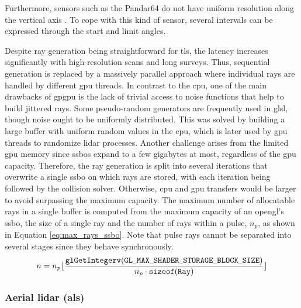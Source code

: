 Furthermore, sensors such as the Pandar64 do not have uniform resolution along the vertical axis \cite{hesai_pandaset_2021}. To cope with this kind of sensor, several intervals can be expressed through the start and limit angles.  

Despite ray generation being straightforward for \acrshort{tls}, the latency increases significantly with high-resolution scans and long surveys. Thus, sequential generation is replaced by a massively parallel approach where individual rays are handled by different \acrshort{gpu} threads. In contrast to the \acrshort{cpu}, one of the main drawbacks of \acrshort{gpgpu} is the lack of trivial access to noise functions that help to build jittered rays. Some pseudo-random generators are frequently used in \acrshort{glsl}, though noise ought to be uniformly distributed. This was solved by building a large buffer with uniform random values in the \acrshort{cpu}, which is later used by \acrshort{gpu} threads to randomize \acrshort{lidar} processes. Another challenge arises from the limited \acrshort{gpu} memory since \acrshort{ssbo}s expand to a few gigabytes at most, regardless of the \acrshort{gpu} capacity. Therefore, the ray generation is split into several iterations that overwrite a single \acrshort{ssbo} on which rays are stored, with each iteration being followed by the collision solver. Otherwise, \acrshort{cpu} and \acrshort{gpu} transfers would be larger to avoid surpassing the maximum capacity. The maximum number of allocatable rays in a single buffer is computed from the maximum capacity of an \acrshort{opengl}'s \acrshort{ssbo}, the size of a single ray and the number of rays within a pulse, $n_p$, as shown in Equation \ref{eq:max_rays_ssbo}. Note that pulse rays cannot be separated into several stages since they behave synchronously.
\begin{equation}
    \label{eq:max_rays_ssbo}   
    n = n_p\lfloor{\frac{\mathtt{\tiny{glGetIntegerv(GL\_MAX\_SHADER\_STORAGE\_BLOCK\_SIZE)}}}{n_p \cdot \tiny{\mathtt{sizeof(Ray)}}}\rfloor}
\end{equation}

\subsubsection{Aerial \acrshort{lidar} (\acrshort{als})}

